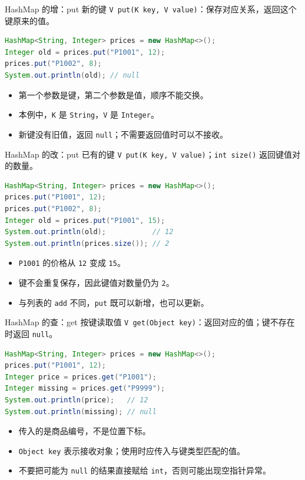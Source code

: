 \documentclass[aspectratio=169]{beamer}
\begin{document}
\begin{frame}[fragile]{HashMap 的增：put 新的键}
  \texttt{V put(K key, V value)}：保存对应关系，返回这个键原来的值。
  \begin{lstlisting}[language=Java]
HashMap<String, Integer> prices = new HashMap<>();
Integer old = prices.put("P1001", 12);
prices.put("P1002", 8);
System.out.println(old); // null
  \end{lstlisting}
  \begin{itemize}
    \item 第一个参数是键，第二个参数是值，顺序不能交换。
    \item 本例中，\texttt{K} 是 \texttt{String}，\texttt{V} 是 \texttt{Integer}。
    \item 新键没有旧值，返回 \texttt{null}；不需要返回值时可以不接收。
  \end{itemize}
\end{frame}

\begin{frame}[fragile]{HashMap 的改：put 已有的键}
  \texttt{V put(K key, V value)}；\texttt{int size()} 返回键值对的数量。
  \begin{lstlisting}[language=Java]
HashMap<String, Integer> prices = new HashMap<>();
prices.put("P1001", 12);
prices.put("P1002", 8);
Integer old = prices.put("P1001", 15);
System.out.println(old);           // 12
System.out.println(prices.size()); // 2
  \end{lstlisting}
  \begin{itemize}
    \item \texttt{P1001} 的价格从 \texttt{12} 变成 \texttt{15}。
    \item 键不会重复保存，因此键值对数量仍为 \texttt{2}。
    \item 与列表的 \texttt{add} 不同，\texttt{put} 既可以新增，也可以更新。
  \end{itemize}
\end{frame}

\begin{frame}[fragile]{HashMap 的查：get 按键读取值}
  \texttt{V get(Object key)}：返回对应的值；键不存在时返回 \texttt{null}。
  \begin{lstlisting}[language=Java]
HashMap<String, Integer> prices = new HashMap<>();
prices.put("P1001", 12);
Integer price = prices.get("P1001");
Integer missing = prices.get("P9999");
System.out.println(price);   // 12
System.out.println(missing); // null
  \end{lstlisting}
  \begin{itemize}
    \item 传入的是商品编号，不是位置下标。
    \item \texttt{Object key} 表示接收对象；使用时应传入与键类型匹配的值。
    \item 不要把可能为 \texttt{null} 的结果直接赋给 \texttt{int}，否则可能出现空指针异常。
  \end{itemize}
\end{frame}
\end{document}
